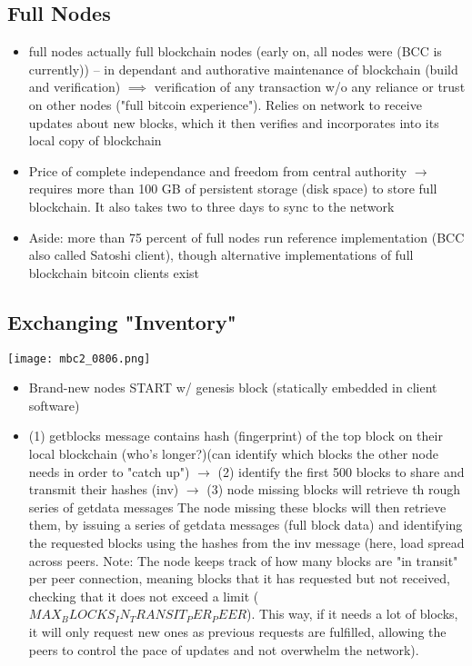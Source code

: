 \documentclass[english, 11pt]{article}
\begin{document}
\subsection{Full Nodes}
\begin{itemize}
    \item full nodes actually full blockchain nodes (early on, all nodes were (BCC is currently)) -- in dependant and authorative maintenance of blockchain (build and verification) $\implies$ verification of any transaction w/o any reliance or trust on other nodes ("full bitcoin experience"). Relies on network to receive updates about new blocks, which it then verifies and incorporates into its local copy of blockchain
    \item Price of complete independance and freedom from central authority $\rightarrow$ requires more than 100 GB of persistent storage (disk space) to store full blockchain. It also takes two to three days to sync to the network
    \item Aside: more than 75 percent of full nodes run reference implementation (BCC also called Satoshi client), though alternative implementations of full blockchain bitcoin clients exist
\end{itemize}

\subsection{Exchanging "Inventory"}
\begin{minipage}{0.3\linewidth}
    \texttt{[image: mbc2\_0806.png]} 
\end{minipage}\hfil
\begin{minipage}{0.65\linewidth}
\begin{itemize}
    \item Brand-new nodes START w/ genesis block (statically embedded in client software)
    \item (1) getblocks message contains hash (fingerprint) of the top block on their local blockchain (who's longer?)(can identify which blocks the other node needs in order to "catch up") $\rightarrow$ (2) identify the first 500 blocks to share and transmit their hashes (inv) $\rightarrow$ (3) node missing blocks will retrieve th rough series of getdata messages The node missing these blocks will then retrieve them, by issuing a series of getdata messages (full block data) and identifying the requested blocks using the hashes from the inv message (here, load spread across peers. Note: The node keeps track of how many blocks are "in transit" per peer connection, meaning blocks that it has requested but not received, checking that it does not exceed a limit ($MAX_BLOCKS_IN_TRANSIT_PER_PEER$). This way, if it needs a lot of blocks, it will only request new ones as previous requests are fulfilled, allowing the peers to control the pace of updates and not overwhelm the network).
\end{itemize}
\end{minipage}
\end{document}
